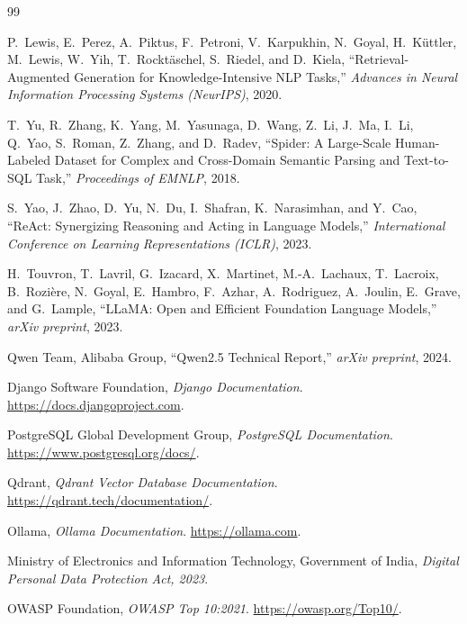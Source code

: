 \documentclass[11pt,a4paper,oneside]{report}
\begin{document}
\begin{thebibliography}{99}

P.~Lewis, E.~Perez, A.~Piktus, F.~Petroni, V.~Karpukhin, N.~Goyal,
H.~K\"uttler, M.~Lewis, W.~Yih, T.~Rockt\"aschel, S.~Riedel, and D.~Kiela,
``Retrieval-Augmented Generation for Knowledge-Intensive NLP Tasks,''
\emph{Advances in Neural Information Processing Systems (NeurIPS)}, 2020.

T.~Yu, R.~Zhang, K.~Yang, M.~Yasunaga, D.~Wang, Z.~Li, J.~Ma, I.~Li,
Q.~Yao, S.~Roman, Z.~Zhang, and D.~Radev,
``Spider: A Large-Scale Human-Labeled Dataset for Complex and Cross-Domain
Semantic Parsing and Text-to-SQL Task,'' \emph{Proceedings of EMNLP}, 2018.

S.~Yao, J.~Zhao, D.~Yu, N.~Du, I.~Shafran, K.~Narasimhan, and Y.~Cao,
``ReAct: Synergizing Reasoning and Acting in Language Models,''
\emph{International Conference on Learning Representations (ICLR)}, 2023.

H.~Touvron, T.~Lavril, G.~Izacard, X.~Martinet, M.-A.~Lachaux, T.~Lacroix,
B.~Rozi\`ere, N.~Goyal, E.~Hambro, F.~Azhar, A.~Rodriguez, A.~Joulin,
E.~Grave, and G.~Lample, ``LLaMA: Open and Efficient Foundation Language
Models,'' \emph{arXiv preprint}, 2023.

Qwen Team, Alibaba Group, ``Qwen2.5 Technical Report,'' \emph{arXiv
preprint}, 2024.

Django Software Foundation, \emph{Django Documentation}.
\url{https://docs.djangoproject.com}.

PostgreSQL Global Development Group, \emph{PostgreSQL Documentation}.
\url{https://www.postgresql.org/docs/}.

Qdrant, \emph{Qdrant Vector Database Documentation}.
\url{https://qdrant.tech/documentation/}.

Ollama, \emph{Ollama Documentation}. \url{https://ollama.com}.

Ministry of Electronics and Information Technology, Government of India,
\emph{Digital Personal Data Protection Act, 2023}.

OWASP Foundation, \emph{OWASP Top 10:2021}.
\url{https://owasp.org/Top10/}.

\end{thebibliography}
\end{document}
